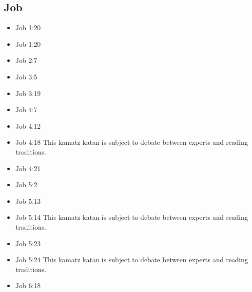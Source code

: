 \documentclass[14pt]{book}
\begin{document}
							\subsection{Job}
							\begin{multicols}{2}\begin{itemize}
									
									\item Job 1:20
									
									\item Job 1:20
									
									\item Job 2:7
									
									\item Job 3:5
									
									\item Job 3:19
									
									\item Job 4:7
									
									\item Job 4:12
									
									\item Job 4:18 This kamatz katan is subject to debate between experts and reading traditions.
									
									\item Job 4:21
									
									\item Job 5:2
									
									\item Job 5:13
									
									\item Job 5:14 This kamatz katan is subject to debate between experts and reading traditions.
									
									\item Job 5:23
									
									\item Job 5:24 This kamatz katan is subject to debate between experts and reading traditions.
									
									\item Job 6:18
									

\end{itemize}
\end{multicols}
\end{document}
